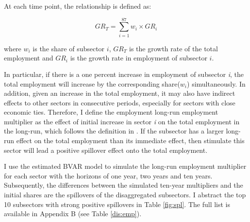 \documentclass{monashthesis}
\begin{document}
At each time point, the relationship is defined as:

\[
GR_T=\sum_{i=1}^{87} w_i\times {GR}_i
\]

where \(w_i\) is the share of subsector \(i\), \(GR_T\) is the growth rate of the total employment and \(GR_i\) is the growth rate in employment of subsector \(i\).

In particular, if there is a one percent increase in employment of subsector \emph{i}, the total employment will increase by the corresponding share(\(w_i\)) simultaneously. In addition, given an increase in the total employment, it may also have indirect effects to other sectors in consecutive periods, especially for sectors with close economic ties. Therefore, I define the employment long-run employment multiplier as the effect of initial increase in sector \emph{i} on the total employment in the long-run, which follows the definition in \textcite{anderson2020}. If the subsector has a larger long-run effect on the total employment than its immediate effect, then stimulate this sector will lead a positive spillover effect onto the total employment.

I use the estimated BVAR model to simulate the long-run employment multiplier for each sector with the horizons of one year, two years and ten years. Subsequently, the differences between the simulated ten-year multipliers and the initial shares are the spillovers of the disaggregated subsectors. I abstract the top 10 subsectors with strong positive spillovers in Table \ref{fig:spl}. The full list is available in Appendix B (see Table \ref{dis:emp}).
\end{document}
